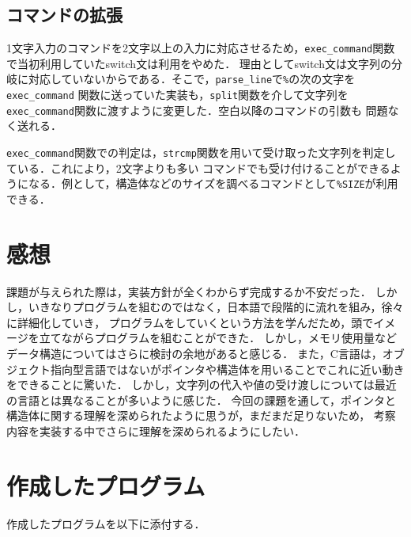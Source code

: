 \documentclass[a4j,11pt]{jarticle}
\begin{document}
\subsection{コマンドの拡張}
1文字入力のコマンドを2文字以上の入力に対応させるため，\verb|exec_command|関数で当初利用していたswitch文は利用をやめた．
理由としてswitch文は文字列の分岐に対応していないからである．そこで，\verb|parse_line|で\verb|%|の次の文字を\verb|exec_command|
関数に送っていた実装も，\verb|split|関数を介して文字列を\verb|exec_command|関数に渡すように変更した．空白以降のコマンドの引数も
問題なく送れる．

\verb|exec_command|関数での判定は，\verb|strcmp|関数を用いて受け取った文字列を判定している．これにより，2文字よりも多い
コマンドでも受け付けることができるようになる．例として，構造体などのサイズを調べるコマンドとして\verb|%SIZE|が利用できる．
\section{感想}
課題が与えられた際は，実装方針が全くわからず完成するか不安だった．
しかし，いきなりプログラムを組むのではなく，日本語で段階的に流れを組み，徐々に詳細化していき，
プログラムをしていくという方法を学んだため，頭でイメージを立てながらプログラムを組むことができた．
しかし，メモリ使用量などデータ構造についてはさらに検討の余地があると感じる．
また，C言語は，オブジェクト指向型言語ではないがポインタや構造体を用いることでこれに近い動きをできることに驚いた．
しかし，文字列の代入や値の受け渡しについては最近の言語とは異なることが多いように感じた．
今回の課題を通して，ポインタと構造体に関する理解を深められたように思うが，まだまだ足りないため，
考察内容を実装する中でさらに理解を深められるようにしたい．
\section{作成したプログラム}\label{sec:program}

作成したプログラムを以下に添付する．
\end{document}
